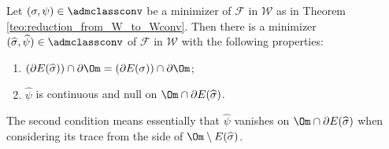 \begin{lemma}\label{lem:continuita-bordo-E}
Let $(\sigma,\psi)\in \admclassconv$ be a minimizer of $\mathcal F$ in $\mathcal W$ as in
Theorem \ref{teo:reduction_from_W_to_Wconv}.
Then there is a minimizer $(\widehat\sigma,\widehat\psi)\in \admclassconv$ of $\mathcal F$ in $\mathcal W$
with the following properties:
\begin{enumerate}[{\rm (1)},wide]
\item\label{lem1.}$(\partial E(\widehat\sigma))\cap\partial\Om=(\partial E(\sigma))\cap\partial\Om$;
\item\label{lem2.} $\widehat\psi$ is continuous and null
on $\Om\cap\partial E(\widehat\sigma)$.
\end{enumerate}
\end{lemma}
The second condition means essentially that $\widehat\psi$ vanishes on $\Om\cap\partial E(\widehat\sigma)$ when considering its trace from the side of $\Om\setminus E(\widehat\sigma)$.

